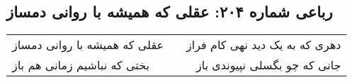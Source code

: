 \begin{center}
\section*{رباعی شماره ۲۰۴: عقلی که همیشه با روانی دمساز}
\label{sec:sh204}
\begin{longtable}{l p{0.5cm} r}
عقلی که همیشه با روانی دمساز
&&
دهری که به یک دید نهی کام فراز
\\
بختی که نباشیم زمانی هم باز
&&
جانی که چو بگسلی نپیوندی باز
\\
\end{longtable}
\end{center}
